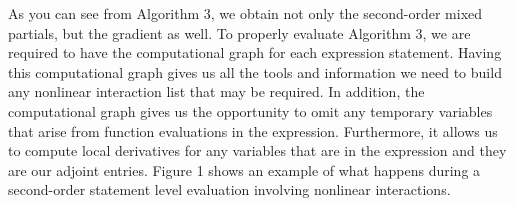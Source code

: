 \documentclass[oneside]{article}
\begin{document}
\begin{algorithm*}[!htb]
\begin{algorithmic}[1]
\EndIf
\EndFor
\end{algorithmic}
 \end{algorithm*}

As you can see from Algorithm 3, we obtain not only the second-order mixed partials, but the gradient as well.  To properly evaluate Algorithm 3, we are required to have the computational graph for each expression statement. Having this computational graph gives us all the tools and information we need to build any nonlinear interaction list that may be required. In addition, the computational graph gives us the opportunity to omit any temporary variables that arise from function evaluations in the expression. Furthermore, it allows us to compute local derivatives for any variables that are in the expression and they are our adjoint entries. Figure 1 shows an example of what happens during a second-order statement level evaluation involving nonlinear interactions. \\
\\
\end{document}
